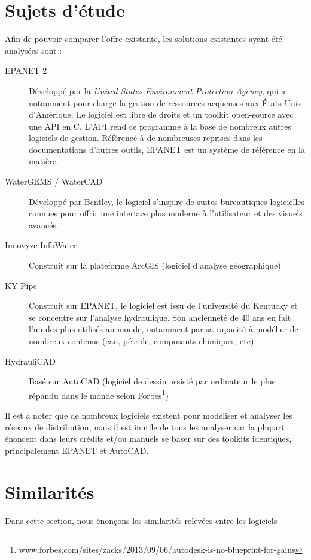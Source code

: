 \documentclass[a4paper, 11pt]{article}
\begin{document}
\section*{Sujets d'étude}
Afin de pouvoir comparer l'offre existante, les solutions existantes ayant été analysées sont :
\begin{description}
    \item[EPANET 2] Développé par la \textit{United States Environment Protection Agency}, qui a notamment pour charge la gestion de ressources acqueuses aux \'Etats-Unis d'Amérique. Le logiciel est libre de droits et un toolkit open-source avec une API en C. L'API rend ce programme à la base de nombreux autres logiciels de gestion. Référencé à de nombreuses reprises dans les documentations d'autres outils, EPANET est un système de référence en la matière.
    \item[WaterGEMS / WaterCAD] Développé par Bentley, le logiciel s'inspire de suites bureautiques logicielles connues pour offrir une interface plus moderne à l'utilisateur et des visuels avancés.
    \item[Innovyze InfoWater] Construit sur la plateforme ArcGIS (logiciel d'analyse géographique)
    \item[KY Pipe] Construit sur EPANET, le logiciel est issu de l'université du Kentucky et se concentre sur l'analyse hydraulique. Son ancienneté de 40 ans en fait l'un des plus utilisés au monde, notamment par sa capacité à modélier de nombreux contenus (eau, pétrole, composants chimiques, etc)
    \item[HydrauliCAD] Basé sur AutoCAD (logiciel de dessin assisté par ordinateur le plus répandu dans le monde selon Forbes\footnote{www.forbes.com/sites/zacks/2013/09/06/autodesk-is-no-blueprint-for-gains})
\end{description}
Il est à noter que de nombreux logiciels existent pour modéliser et analyser les réseaux de distribution, mais il est inutile de tous les analyser car la plupart énoncent dans leurs crédits et/ou manuels se baser sur des toolkits identiques, principalement EPANET et AutoCAD.

\section{Similarités}
Dans cette section, nous énonçons les similarités relevées entre les logiciels
\end{document}
